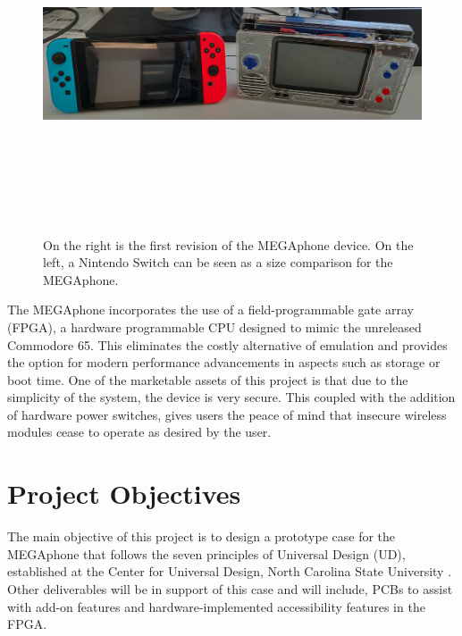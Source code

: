\begin{figure} [h]
    \centering
    \includegraphics[width=12cm,height=10cm,keepaspectratio]{Figures/megaphone.png}
    \caption{On the right is the first revision of the MEGAphone device. On the left, a Nintendo Switch \cite{nintendoswitch} can be seen as a size comparison for the MEGAphone.}
    \label{fig:Jellybean}
\end{figure}

The MEGAphone incorporates the use of a field-programmable gate array (FPGA), a hardware programmable CPU designed to mimic the unreleased Commodore 65.
This eliminates the costly alternative of emulation and provides the option for modern performance advancements in aspects such as storage or boot time.
One of the marketable assets of this project is that due to the simplicity of the system, the device is very secure.
This coupled with the addition of hardware power switches, gives users the peace of mind that insecure wireless modules cease to operate as desired by the user.

\section{Project Objectives}

The main objective of this project is to design a prototype case for the MEGAphone that follows the seven principles of Universal Design (UD), established at the Center for Universal Design, North Carolina State University \cite{sevenprinciples}. 
Other deliverables will be in support of this case and will include, PCBs to assist with add-on features and hardware-implemented accessibility features in the FPGA.

